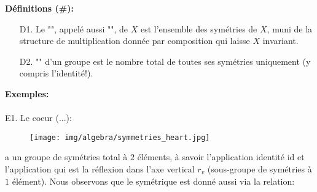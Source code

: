 	\textbf{Définitions (\#\mydef):}
	\begin{enumerate}
		\item[D1.] Le "", appelé aussi "", de $X$ est l'ensemble des symétries de $X$, muni de la structure de multiplication donnée par composition qui laisse $X$ invariant.
		
		\item[D2.] "" d'un groupe est le nombre total de toutes ses symétries uniquement (y compris l'identité!).
	\end{enumerate}
	\begin{tcolorbox}[colframe=black,colback=white,sharp corners]
	\textbf{{\Large {}}Exemples:}\\\\
	E1. Le coeur (...):
	\begin{figure}[H]
		\centering
		\texttt{[image: img/algebra/symmetries\_heart.jpg]}
	\end{figure}
	a un groupe de symétries total à $2$ éléments, à savoir l'application identité $\text{id}$ et l'application qui est la réflexion dans l'axe vertical $r_v$ (sous-groupe de symétries à $1$ élément). Nous observons que le symétrique est donné aussi via la relation:
	
	\end{tcolorbox}
	
